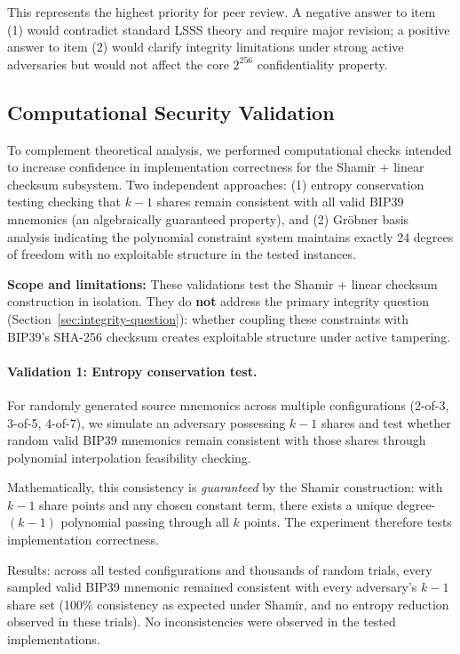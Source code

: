\documentclass[11pt]{article}
\begin{document}
This represents the highest priority for peer review. A negative answer to item (1) would contradict standard LSSS theory and require major revision; a positive answer to item (2) would clarify integrity limitations under strong active adversaries but would not affect the core $2^{256}$ confidentiality property.

\subsection{Computational Security Validation}

To complement theoretical analysis, we performed computational checks intended to increase confidence in implementation correctness for the Shamir + linear checksum subsystem. Two independent approaches: (1) entropy conservation testing checking that $k-1$ shares remain consistent with all valid BIP39 mnemonics (an algebraically guaranteed property), and (2) Gröbner basis analysis indicating the polynomial constraint system maintains exactly 24 degrees of freedom with no exploitable structure in the tested instances.

\textbf{Scope and limitations:} These validations test the Shamir + linear checksum construction in isolation. They do \textbf{not} address the primary integrity question (Section~\ref{sec:integrity-question}): whether coupling these constraints with BIP39's SHA-256 checksum creates exploitable structure under active tampering.

\paragraph{Validation 1: Entropy conservation test.} For randomly generated source mnemonics across multiple configurations (2-of-3, 3-of-5, 4-of-7), we simulate an adversary possessing $k-1$ shares and test whether random valid BIP39 mnemonics remain consistent with those shares through polynomial interpolation feasibility checking.

Mathematically, this consistency is \textit{guaranteed} by the Shamir construction: with $k-1$ share points and any chosen constant term, there exists a unique degree-$(k-1)$ polynomial passing through all $k$ points. The experiment therefore tests implementation correctness.

Results: across all tested configurations and thousands of random trials, every sampled valid BIP39 mnemonic remained consistent with every adversary's $k-1$ share set (100\% consistency as expected under Shamir, and no entropy reduction observed in these trials). No inconsistencies were observed in the tested implementations.
\end{document}
